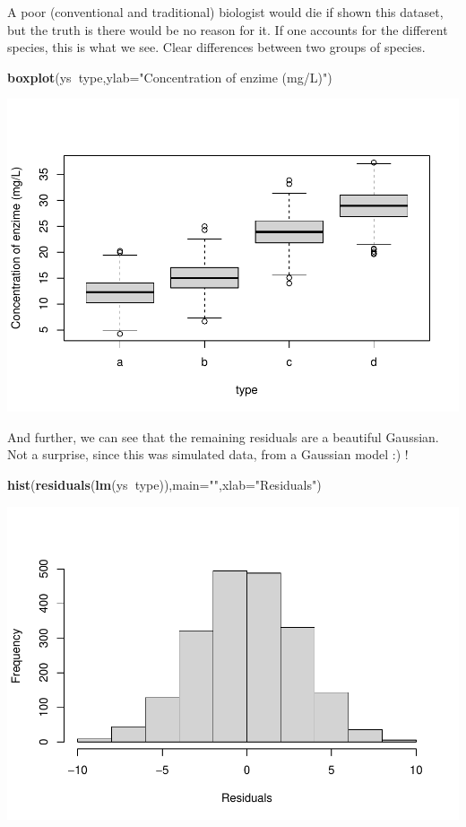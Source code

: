 \documentclass[
]{book}
\newenvironment{Shaded}{\begin{snugshade}}{\end{snugshade}}
\newcommand{\DataTypeTok}[1]{\textcolor[rgb]{0.13,0.29,0.53}{#1}}
\newcommand{\KeywordTok}[1]{\textcolor[rgb]{0.13,0.29,0.53}{\textbf{#1}}}
\newcommand{\NormalTok}[1]{#1}
\newcommand{\OperatorTok}[1]{\textcolor[rgb]{0.81,0.36,0.00}{\textbf{#1}}}
\newcommand{\StringTok}[1]{\textcolor[rgb]{0.31,0.60,0.02}{#1}}
\begin{document}
A poor (conventional and traditional) biologist would die if shown this dataset, but the truth is there would be no reason for it. If one accounts for the different species, this is what we see. Clear differences between two groups of species.

\begin{Shaded}
\begin{Highlighting}[]
\KeywordTok{boxplot}\NormalTok{(ys}\OperatorTok{~}\NormalTok{type,}\DataTypeTok{ylab=}\StringTok{"Concentration of enzime (mg/L)"}\NormalTok{)}
\end{Highlighting}
\end{Shaded}

\includegraphics{ECOMODbook_files/figure-latex/reg11-1.pdf}

And further, we can see that the remaining residuals are a beautiful Gaussian. Not a surprise, since this was simulated data, from a Gaussian model :) !

\begin{Shaded}
\begin{Highlighting}[]
\KeywordTok{hist}\NormalTok{(}\KeywordTok{residuals}\NormalTok{(}\KeywordTok{lm}\NormalTok{(ys}\OperatorTok{~}\NormalTok{type)),}\DataTypeTok{main=}\StringTok{""}\NormalTok{,}\DataTypeTok{xlab=}\StringTok{"Residuals"}\NormalTok{)}
\end{Highlighting}
\end{Shaded}

\includegraphics{ECOMODbook_files/figure-latex/reg12-1.pdf}
\end{document}
